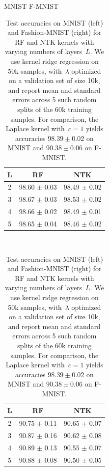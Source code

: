 \begin{table}[t]
\caption{Test accuracies on MNIST (left) and Fashion-MNIST (right) for RF and NTK kernels with varying numbers of layers~$L$.
We use kernel ridge regression on 50k samples, with~$\lambda$ optimized on a validation set of size 10k, and report mean and standard errors across 5 such random splits of the 60k training samples.
For comparison, the Laplace kernel with~$c=1$ yields accuracies $98.39 \pm 0.02$ on MNIST and $90.38 \pm 0.06$ on F-MNIST.}
\label{tab:mnist_acc}
\centering

MNIST \hspace{4cm} F-MNIST
\vspace{0.1cm}
\small

\begin{tabular}{ | c |  c |  c |  }
\hline
L &  RF & NTK \\ \hline
2  & 98.60 $\pm$ 0.03 
 & 98.49 $\pm$ 0.02 
\\ 
3  & 98.67 $\pm$ 0.03 
 & 98.53 $\pm$ 0.02 
\\ 
4  & 98.66 $\pm$ 0.02 
 & 98.49 $\pm$ 0.01 
\\ 
5  & 98.65 $\pm$ 0.04 
 & 98.46 $\pm$ 0.02 
\\ 
\hline
\end{tabular}
~~
\begin{tabular}{ | c |  c |  c |  }
\hline
L &  RF & NTK \\ \hline
2  & 90.75 $\pm$ 0.11 
 & 90.65 $\pm$ 0.07 
\\ 
3  & 90.87 $\pm$ 0.16 
 & 90.62 $\pm$ 0.08 
\\ 
4  & 90.89 $\pm$ 0.13 
 & 90.55 $\pm$ 0.07 
\\ 
5  & 90.88 $\pm$ 0.08 
 & 90.50 $\pm$ 0.05 
\\ 
\hline
\end{tabular}

\end{table}

